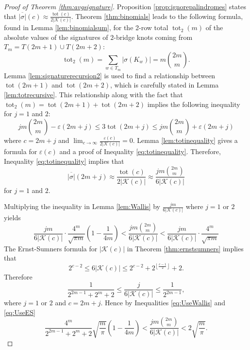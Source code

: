 \documentclass[12pt]{amsart}
\theoremstyle{definition}
\theoremstyle{remark}
\numberwithin{equation}{section}
\def\tot{\operatorname{tot}}
\begin{document}
\begin{proof}[Proof of Theorem \ref{thm:avgsignature}]
Proposition \ref{prop:ignorepalindromes} states that $\overline{|\sigma|}(c)\approx \frac{\tot(c)}{2|\mathcal{K}(c)|}$. Theorem \ref{thm:binomials} leads to the following formula, found in Lemma \ref{lem:binomialsum}, for the 2-row total $\tot_2(m)$ of the absolute values of the signatures of $2$-bridge knots coming from $T_m=T(2m+1)\cup T(2m+2)$:
\[\tot_2(m) = \sum_{w\in T_m} |\sigma(K_w)| = m\binom{2m}{m}.\]
Lemma \ref{lem:signaturerecursion2} is used to find a relationship between $\tot(2m+1)$ and $\tot(2m+2)$, which is carefully stated in Lemma \ref{lem:totrecursive}. This relationship along with the fact that $\tot_2(m)=\tot(2m+1)+\tot(2m+2)$ implies the following inequality for $j=1$ and $2$:
\begin{equation}
\label{eq:totinequality}
   jm\binom{2m}{m}  - \varepsilon(2m+j)\leq 3\tot(2m+j)\leq jm\binom{2m}{m}+\varepsilon(2m+j)
    \end{equation}
where $c=2m+j$ and $\displaystyle\lim_{c\to\infty}\frac{\varepsilon(c)}{2|\mathcal{K}(c)|}=0$. Lemma \ref{lem:totinequality} gives a formula for $\varepsilon(c)$ and a proof of Inequality \eqref{eq:totinequality}.  Therefore, Inequality \eqref{eq:totinequality} implies that
\begin{equation}
    \label{eq:sigav1}
    \overline{|\sigma|}(2m+j) \approx \frac{\tot(c)}{2|\mathcal{K}(c)|} \approx \frac{jm \binom{2m}{m}}{6|\mathcal{K}(c)|}
\end{equation}
for $j=1$ and $2$.

Multiplying the inequality in Lemma \ref{lem:Wallis} by $\frac{jm}{6|\mathcal{K}(c)|}$ where $j=1$ or $2$ yields
\begin{equation}
\label{eq:UseWallis}
\frac{jm}{6|\mathcal{K}(c)|} \cdot \frac{4^m}{\sqrt{\pi m}} \left(1-\frac{1}{4m}\right) <  \frac{jm \binom{2m}{m}}{6|\mathcal{K}(c)|} < \frac{jm}{6|\mathcal{K}(c)|} \cdot \frac{4^m}{\sqrt{\pi m}}
\end{equation}
The Ernst-Sumners formula for $|\mathcal{K}(c)|$ in Theorem \ref{thm:ernstsumners} implies that
\[2^{c-2}\leq 6|\mathcal{K}(c)| \leq 2^{c-2}+2^{\left\lfloor\frac{c-1}{2}\right\rfloor}+2.\]
Therefore
\begin{equation}
\label{eq:UseES}
\frac{1}{2^{2m-1}+2^m+2} \leq \frac{j}{6|\mathcal{K}(c)|} \leq \frac{1}{2^{2m-1}},    
\end{equation}
where $j=1$ or $2$ and $c=2m+j$. Hence by Inequalities \eqref{eq:UseWallis} and \eqref{eq:UseES}
\[\frac{4^m}{2^{2m-1}+2^m+2}\sqrt{\frac{m}{\pi}}\left(1-\frac{1}{4m}\right) < \frac{jm \binom{2m}{m}}{6|\mathcal{K}(c)|} < 2\sqrt{\frac{m}{\pi}}. \]


\end{proof}
\end{document}
